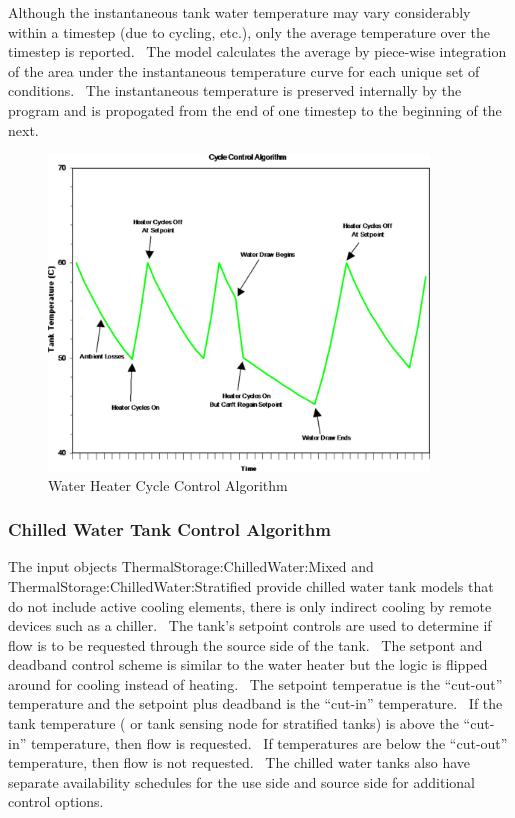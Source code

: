 Although the instantaneous tank water temperature may vary considerably within a timestep (due to cycling, etc.), only the average temperature over the timestep is reported.~ The model calculates the average by piece-wise integration of the area under the instantaneous temperature curve for each unique set of conditions.~ The instantaneous temperature is preserved internally by the program and is propogated from the end of one timestep to the beginning of the next.

\begin{figure}[hbtp] %
\centering
\includegraphics[width=0.9\textwidth, height=0.9\textheight, keepaspectratio=true]{media/image6852.png}
\caption{Water Heater Cycle Control Algorithm \protect \label{fig:water-heater-cycle-control-algorithm}}
\end{figure}

\subsubsection{Chilled Water Tank Control Algorithm}\label{chilled-water-tank-control-algorithm}

The input objects ThermalStorage:ChilledWater:Mixed and ThermalStorage:ChilledWater:Stratified provide chilled water tank models that do not include active cooling elements, there is only indirect cooling by remote devices such as a chiller.~ The tank's setpoint controls are used to determine if flow is to be requested through the source side of the tank.~ The setpont and deadband control scheme is similar to the water heater but the logic is flipped around for cooling instead of heating.~ The setpoint temperatue is the ``cut-out'' temperature and the setpoint plus deadband is the ``cut-in'' temperature.~ If the tank temperature ( or tank sensing node for stratified tanks) is above the ``cut-in'' temperature, then flow is requested.~ If temperatures are below the ``cut-out'' temperature, then flow is not requested.~ The chilled water tanks also have separate availability schedules for the use side and source side for additional control options.

